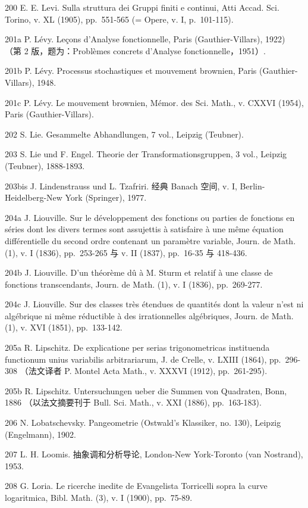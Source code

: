 200 E. E. Levi. Sulla struttura dei Gruppi finiti e continui, Atti Accad. Sci. Torino, v. XL (1905), pp.~551-565 (= Opere, v. I, p.~101-115).

201a P. Lévy. Leçons d'Analyse fonctionnelle, Paris (Gauthier-Villars), 1922) （第 2 版，题为：Problèmes concrets d'Analyse fonctionnelle，1951）.

201b P. Lévy. Processus stochastiques et mouvement brownien, Paris (Gauthier-Villars), 1948.

201c P. Lévy. Le mouvement brownien, Mémor. des Sci. Math., v. CXXVI (1954), Paris (Gauthier-Villars).

202 S. Lie. Gesammelte Abhandlungen, 7 vol., Leipzig (Teubner).

203 S. Lie und F. Engel. Theorie der Transformationsgruppen, 3 vol., Leipzig (Teubner), 1888-1893.

203bis J. Lindenstrauss und L. Tzafriri. 经典 Banach 空间, v. I, Berlin-Heidelberg-New York (Springer), 1977.

204a J. Liouville. Sur le développement des fonctions ou parties de fonctions en séries dont les divers termes sont assujettis à satisfaire à une même équation différentielle du second ordre contenant un paramètre variable, Journ. de Math. (1), v. I (1836), pp.~253-265 与 v. II (1837), pp.~16-35 与 418-436.

204b J. Liouville. D'un théorème dû à M. Sturm et relatif à une classe de fonctions transcendants, Journ. de Math. (1), v. I (1836), pp.~269-277.

204c J. Liouville. Sur des classes très étendues de quantités dont la valeur n'est ni algébrique ni même réductible à des irrationnelles algébriques, Journ. de Math. (1), v. XVI (1851), pp.~133-142.

205a R. Lipschitz. De explicatione per serias trigonometricas instituenda functionum unius variabilis arbitrariarum, J. de Crelle, v. LXIII (1864), pp.~296-308 （法文译者 P. Montel Acta Math., v. XXXVI (1912), pp.~261-295).

205b R. Lipschitz. Untersuchungen ueber die Summen von Quadraten, Bonn, 1886 （以法文摘要刊于 Bull. Sci. Math., v. XXI (1886), pp.~163-183).

206 N. Lobatschevsky. Pangeometrie (Ostwald's Klassiker, no. 130), Leipzig (Engelmann), 1902.

207 L. H. Loomis. 抽象调和分析导论, London-New York-Toronto (van Nostrand), 1953.

208 G. Loria. Le ricerche inedite de Evangelista Torricelli sopra la curve logaritmica, Bibl. Math. (3), v. I (1900), pp.~75-89.

